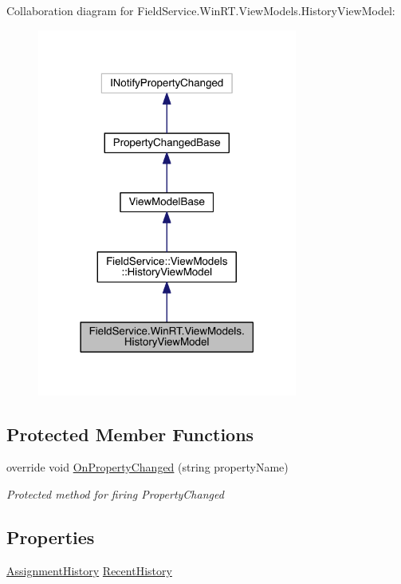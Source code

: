 Collaboration diagram for Field\+Service.\+Win\+R\+T.\+View\+Models.\+History\+View\+Model\+:
\nopagebreak
\begin{figure}[H]
\begin{center}
\leavevmode
\includegraphics[width=242pt]{class_field_service_1_1_win_r_t_1_1_view_models_1_1_history_view_model__coll__graph}
\end{center}
\end{figure}
\subsection*{Protected Member Functions}
\begin{DoxyCompactItemize}
\item 
override void \hyperlink{class_field_service_1_1_win_r_t_1_1_view_models_1_1_history_view_model_aa2442739713b5660e32190dfb08bb095}{On\+Property\+Changed} (string property\+Name)
\begin{DoxyCompactList}\small\item\em Protected method for firing Property\+Changed \end{DoxyCompactList}\end{DoxyCompactItemize}
\subsection*{Properties}
\begin{DoxyCompactItemize}
\item 
\hyperlink{class_field_service_1_1_data_1_1_assignment_history}{Assignment\+History} \hyperlink{class_field_service_1_1_win_r_t_1_1_view_models_1_1_history_view_model_a859bff3fef3349721f15989cc91c2531}{Recent\+History}
\end{DoxyCompactItemize}
